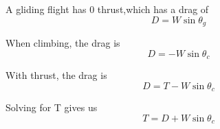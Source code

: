 \documentclass{article}
\begin{document}
A gliding flight has 0 thrust,which has a drag of
\[
D=W\sin\theta_g
\]

When climbing, the drag is
\[
D=-W\sin\theta_c
\]

With thrust, the drag is
\[
D=T - W\sin\theta_c
\]

Solving for T gives us
\[
T=D+W\sin\theta_c
\]
\end{document}
